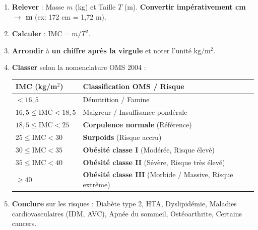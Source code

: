 \documentclass[11pt]{article}
\begin{document}
\begin{methode}
\begin{enumerate}
\item \textbf{Relever} : Masse $m$ (kg) et Taille $T$ (m). \textbf{Convertir impérativement cm $\rightarrow$ m} (ex: 172 cm = 1,72 m).
\item \textbf{Calculer} : $\text{IMC} = m / T^2$.
\item \textbf{Arrondir} à \textbf{un chiffre après la virgule} et noter l'unité $\mathrm{kg/m^2}$.
\item \textbf{Classer} selon la nomenclature OMS 2004 :
\begin{center}
\begin{tabularx}{\linewidth}{|l|X|}\hline
\rowcolor{popblueL} \textbf{IMC (kg/m$^2$)} & \textbf{Classification OMS / Risque} \\ \hline
$< 16,5$ & Dénutrition / Famine \\ \hline
$16,5 \leq \text{IMC} < 18,5$ & Maigreur / Insuffisance pondérale \\ \hline
$18,5 \leq \text{IMC} < 25$ & \textbf{Corpulence normale} (Référence) \\ \hline
$25 \leq \text{IMC} < 30$ & \textbf{Surpoids} (Risque accru) \\ \hline
$30 \leq \text{IMC} < 35$ & \textbf{Obésité classe I} (Modérée, Risque élevé) \\ \hline
$35 \leq \text{IMC} < 40$ & \textbf{Obésité classe II} (Sévère, Risque très élevé) \\ \hline
$\geq 40$ & \textbf{Obésité classe III} (Morbide / Massive, Risque extrême) \\ \hline
\end{tabularx}
\end{center}
\item \textbf{Conclure} sur les risques : Diabète type 2, HTA, Dyslipidémie, Maladies cardiovasculaires (IDM, AVC), Apnée du sommeil, Ostéoarthrite, Certains cancers.
\end{enumerate}
\end{methode}
\end{document}
